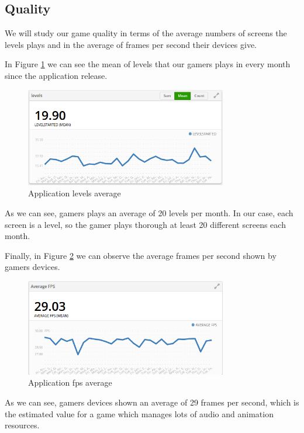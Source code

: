 \subsection{Quality}

We will study our game quality in terms of the average numbers of screens the levels plays and in the average of frames per second their devices give.

In Figure \ref{fig:app-levels} we can see the mean of levels that our gamers plays in every month since the application release.

\begin{figure}[h]
\centering
\includegraphics[width=250pt]{graphics/evaluation/app_levels.png}
\caption{Application levels average}
\label{fig:app-levels}
\end{figure}

\FloatBarrier

As we can see, gamers plays an average of 20 levels per month. In our case, each screen is a level, so the gamer plays thorough at least 20 different screens each month.

Finally, in Figure \ref{fig:app-fps} we can observe the average frames per second shown by gamers devices. 

\begin{figure}[h]
\centering
\includegraphics[width=250pt]{graphics/evaluation/app_fps.png}
\caption{Application fps average}
\label{fig:app-fps}
\end{figure}

\FloatBarrier

As we can see, gamers devices shown an average of 29 frames per second, which is the estimated value for a game which manages lots of audio and animation resources.

